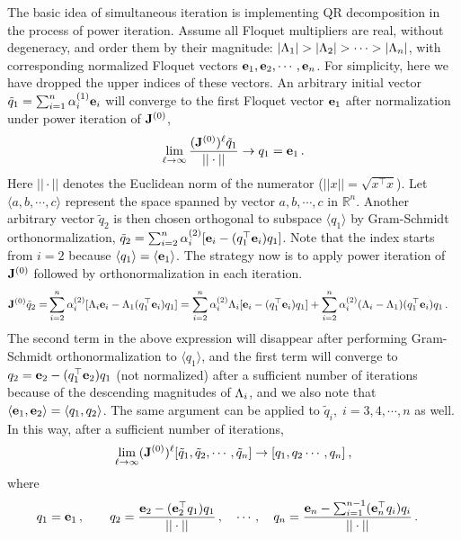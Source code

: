 \documentclass[final,leqno,onefignum,onetabnum]{siamltexmm}
\begin{document}
The basic idea of simultaneous iteration is implementing QR decomposition
in the process of power iteration. Assume all Floquet multipliers
are real, without degeneracy, and order them by their
magnitude: $|\ExpaEig_{1}|>|\ExpaEig_{2}|>\cdots >|\ExpaEig_{n}|$, with
corresponding normalized Floquet vectors
$\jEigvec[1], \jEigvec[2],\cdots, \jEigvec[n]$.
For simplicity, here we have dropped the upper indices of these vectors.
An arbitrary initial vector
$\tilde{q}_{1}=\sum_{i=1}^{n}\alpha^{(1)}_{i}\jEigvec[i]$ will converge to the
first Floquet vector $\jEigvec[1]$ after normalization under power iteration of
$\ps{\jMps}{0}$,
\[
 \lim_{\ell\to \infty }\frac{(\ps{\jMps}{0})^{\ell}\tilde{q}_{1}}{||\cdot||}
 \to q_{1}=\jEigvec[1]
 \,.
\]
Here $||\cdot||$ denotes the Euclidean norm of the numerator
($||x||=\sqrt{x^\top x}$). Let $\langle a,b,\cdots,c\rangle$ represent
the space spanned by vector $a,b,\cdots,c$ in $\mathbb{R}^n$. Another
arbitrary vector $\tilde{q}_{2}$ is then chosen orthogonal to subspace
$\langle q_{1} \rangle$ by Gram-Schmidt orthonormalization,
$\tilde{q}_{2}= \sum_{i=2}^{n}\alpha^{(2)}_{i}[\jEigvec[i]-(q_{1}^\top
\jEigvec[i])q_{1}]$.
Note that the index starts from $i=2$ because $\langle q_{1}
\rangle=\langle {\jEigvec[1]} \rangle$. The strategy now is to apply power
iteration of $\ps{\jMps}{0}$ followed by orthonormalization in each
iteration.
\begin{align*}
  \ps{\jMps}{0}\tilde{q}_{2}= &\sum_{i=2}^{n}\alpha^{(2)}_{i}
  [\ExpaEig_{i}\jEigvec[i]-\ExpaEig_{1}(q_{1}^\top \jEigvec[i])q_1]
  = \sum_{i=2}^{n}\alpha^{(2)}_{i}\ExpaEig_{i}[\jEigvec[i]-
  (q_{1}^\top \jEigvec[i])q_{1}]+\sum_{i=2}^{n}\alpha^{(2)}_{i}
  (\ExpaEig_{i}-\ExpaEig_{1})(q_{1}^\top \jEigvec[i])q_{1}
  \,.
\end{align*}
The second term in the above expression will disappear after performing
Gram-Schmidt orthonormalization to $\langle q_{1} \rangle$, and the first
term will converge to
$q_{2}=\jEigvec[2]-(q_{1}^\top \jEigvec[2])q_{1}$ (not
normalized) after a sufficient number of iterations because of the
descending magnitudes of $\ExpaEig_{i}$, and we also note that $\langle
{\jEigvec[1], \jEigvec[2]} \rangle=\langle q_{1}, q_{2}\rangle$. The same argument can
be applied to $\tilde{q}_{i},\;i=3,4,\cdots,n$ as well.
In this way, after a sufficient number of iterations,
\[
\lim_{\ell\to \infty}(\ps{\jMps}{0})^{\ell}[\tilde{q}_{1},\tilde{q}_{2},\cdots,
\tilde{q}_{n}]
\to [q_{1},q_{2}\cdots, q_{n}]
\:,
\]
where
\[
\begin{aligned}
  & q_{1} = \jEigvec[1]\,,\qquad
    q_{2} = \frac{\jEigvec[2]-(\jEigvec[2]^\top q_{1})q_{1}}{||\cdot ||}\,,
    \quad \cdots\,,\quad
    q_{n} = \frac{\jEigvec[n]-\sum_{i=1}^{n-1}(\jEigvec[n]^\top
      q_{i})q_{i}}{||\cdot ||}
\,.
\end{aligned}
\]
\end{document}
